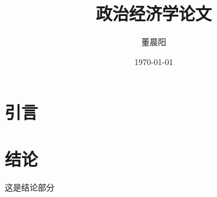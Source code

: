 \documentclass[a4paper]{ctexart}
\title{政治经济学论文}
\author{董晨阳}
\date{\today}
\begin{document}
\maketitle
\clearpage

\section{引言}

\section{结论}
这是结论部分\autocite{vaswani2017attention}
\printbibliography[heading=bibliography,title=参考文献]
\end{document}
